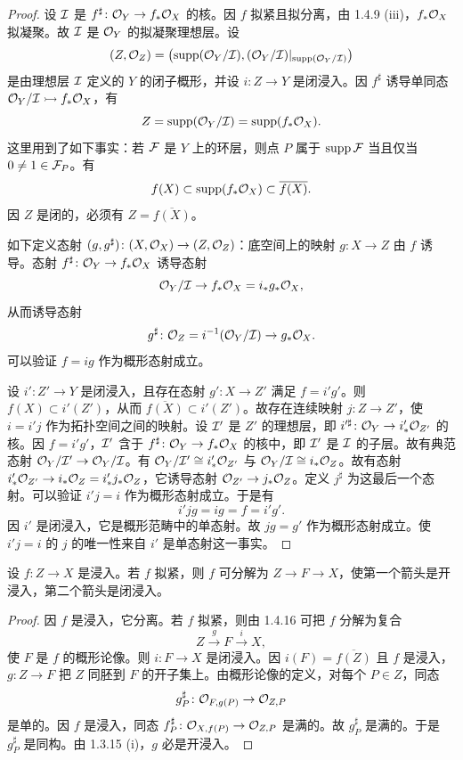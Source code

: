\begin{proof}
设 $\mathcal{I}$ 是 $f^\sharp\colon\mathcal{O}_Y\to f_*\mathcal{O}_X$ 的核。因 $f$ 拟紧且拟分离，由 1.4.9 (iii)，$f_*\mathcal{O}_X$ 拟凝聚。故 $\mathcal{I}$ 是 $\mathcal{O}_Y$ 的拟凝聚理想层。设
\[
(Z,\mathcal{O}_Z)=\bigl(\operatorname{supp}(\mathcal{O}_Y/\mathcal{I}),(\mathcal{O}_Y/\mathcal{I})|_{\operatorname{supp}(\mathcal{O}_Y/\mathcal{I})}\bigr)
\]
是由理想层 $\mathcal{I}$ 定义的 $Y$ 的闭子概形，并设 $i\colon Z\to Y$ 是闭浸入。因 $f^\sharp$ 诱导单同态 $\mathcal{O}_Y/\mathcal{I}\rightarrowtail f_*\mathcal{O}_X$，有
\[
Z=\operatorname{supp}(\mathcal{O}_Y/\mathcal{I})=\operatorname{supp}(f_*\mathcal{O}_X).
\]
这里用到了如下事实：若 $\mathcal{F}$ 是 $Y$ 上的环层，则点 $P$ 属于 $\operatorname{supp}\mathcal{F}$ 当且仅当 $0\ne1\in\mathcal{F}_P$。有
\[
f(X)\subset\operatorname{supp}(f_*\mathcal{O}_X)\subset\overline{f(X)}.
\]
因 $Z$ 是闭的，必须有 $Z=\overline{f(X)}$。

如下定义态射 $(g,g^\sharp)\colon(X,\mathcal{O}_X)\to(Z,\mathcal{O}_Z)$：底空间上的映射 $g\colon X\to Z$ 由 $f$ 诱导。态射 $f^\sharp\colon\mathcal{O}_Y\to f_*\mathcal{O}_X$ 诱导态射
\[
\mathcal{O}_Y/\mathcal{I}\to f_*\mathcal{O}_X=i_*g_*\mathcal{O}_X,
\]
从而诱导态射
\[
g^\sharp\colon\mathcal{O}_Z=i^{-1}(\mathcal{O}_Y/\mathcal{I})\to g_*\mathcal{O}_X.
\]
可以验证 $f=ig$ 作为概形态射成立。

设 $i'\colon Z'\to Y$ 是闭浸入，且存在态射 $g'\colon X\to Z'$ 满足 $f=i'g'$。则 $f(X)\subset i'(Z')$，从而 $\overline{f(X)}\subset i'(Z')$。故存在连续映射 $j\colon Z\to Z'$，使 $i=i'j$ 作为拓扑空间之间的映射。设 $\mathcal{I}'$ 是 $Z'$ 的理想层，即 $i'^\sharp\colon\mathcal{O}_Y\to i'_*\mathcal{O}_{Z'}$ 的核。因 $f=i'g'$，$\mathcal{I}'$ 含于 $f^\sharp\colon\mathcal{O}_Y\to f_*\mathcal{O}_X$ 的核中，即 $\mathcal{I}'$ 是 $\mathcal{I}$ 的子层。故有典范态射 $\mathcal{O}_Y/\mathcal{I}'\to\mathcal{O}_Y/\mathcal{I}$。有 $\mathcal{O}_Y/\mathcal{I}'\cong i'_*\mathcal{O}_{Z'}$ 与 $\mathcal{O}_Y/\mathcal{I}\cong i_*\mathcal{O}_Z$。故有态射 $i'_*\mathcal{O}_{Z'}\to i_*\mathcal{O}_Z=i'_*j_*\mathcal{O}_Z$，它诱导态射 $\mathcal{O}_{Z'}\to j_*\mathcal{O}_Z$。定义 $j^\sharp$ 为这最后一个态射。可以验证 $i'j=i$ 作为概形态射成立。于是有
\[
i'jg=ig=f=i'g'.
\]
因 $i'$ 是闭浸入，它是概形范畴中的单态射。故 $jg=g'$ 作为概形态射成立。使 $i'j=i$ 的 $j$ 的唯一性来自 $i'$ 是单态射这一事实。
\end{proof}

\begin{corollary}\label{it:1.4.17}
设 $f\colon Z\to X$ 是浸入。若 $f$ 拟紧，则 $f$ 可分解为 $Z\to F\to X$，使第一个箭头是开浸入，第二个箭头是闭浸入。
\end{corollary}

\begin{proof}
因 $f$ 是浸入，它分离。若 $f$ 拟紧，则由 1.4.16 可把 $f$ 分解为复合
\[
Z\xrightarrow{g}F\xrightarrow{i}X,
\]
使 $F$ 是 $f$ 的概形论像。则 $i\colon F\to X$ 是闭浸入。因 $i(F)=\overline{f(Z)}$ 且 $f$ 是浸入，$g\colon Z\to F$ 把 $Z$ 同胚到 $F$ 的开子集上。由概形论像的定义，对每个 $P\in Z$，同态
\[
g^\sharp_P\colon\mathcal{O}_{F,g(P)}\to\mathcal{O}_{Z,P}
\]
是单的。因 $f$ 是浸入，同态 $f^\sharp_P\colon\mathcal{O}_{X,f(P)}\to\mathcal{O}_{Z,P}$ 是满的。故 $g^\sharp_P$ 是满的。于是 $g^\sharp_P$ 是同构。由 1.3.15 (i)，$g$ 必是开浸入。
\end{proof}

